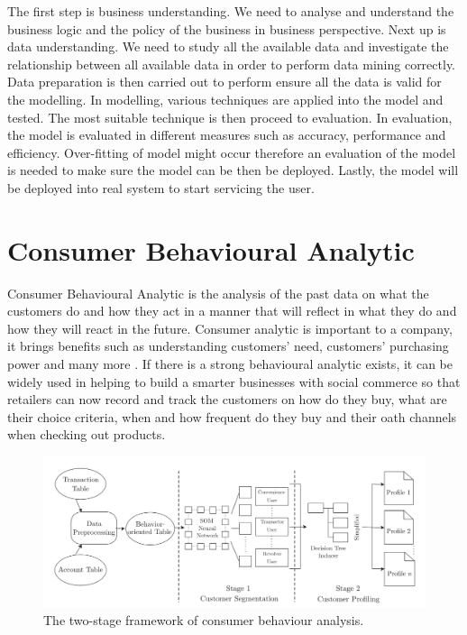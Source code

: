 \documentclass[journal]{IEEEtran}
\begin{document}
The first step is business understanding. We need to analyse and understand the business logic and the policy of the business in business perspective. Next up is data understanding. We need to study all the available data and investigate the relationship between all available data in order to perform data mining correctly. Data preparation is then carried out to perform ensure all the data is valid for the modelling. In modelling, various techniques are applied into the model and tested. The most suitable technique is then proceed to evaluation. In evaluation, the model is evaluated in different measures such as accuracy, performance and efficiency. Over-fitting of model might occur therefore an evaluation of the model is needed to make sure the model can be then be deployed. Lastly, the model will be deployed into real system to start servicing the user.

\section{Consumer Behavioural Analytic}
Consumer Behavioural Analytic is the analysis of the past data on what the customers do and how they act in a manner that will reflect in what they do and how they will react in the future. Consumer analytic is important to a company, it brings benefits such as understanding customers’ need, customers’ purchasing power and many more \cite{Erevelles2016-oa}. If there is a strong behavioural analytic exists, it can be widely used in helping to build a smarter businesses with social commerce so that retailers can now record and track the customers on how do they buy, what are their choice criteria, when and how frequent do they buy and their oath channels when checking out products.

\begin{figure}[!ht]
	\centering
	\includegraphics[scale=0.2]{framework}
	\caption{The two-stage framework of consumer behaviour analysis\cite{Hsieh2009-rc}.}
\end{figure}
\end{document}

